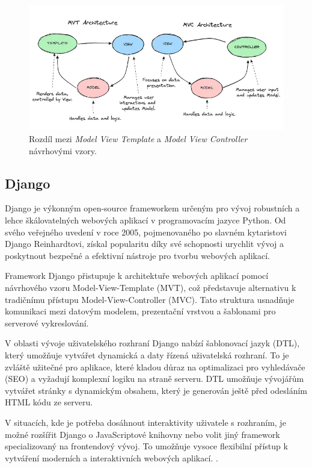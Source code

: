 \begin{figure}[H]
    \centering
    \includegraphics[width=1.0\textwidth]{figures/mvc_mvt_difference}
    \caption{Rozdíl mezi \textit{Model View Template} a \textit{Model View Controller} návrhovými vzory. \cite{mvc_mvt_difference_img}}
    \label{fig:mvc_mvt_difference}
\end{figure}

\subsection{Django}
\label{subsec:dev-framework-django}

Django je výkonným open-source frameworkem určeným pro vývoj robustních a lehce škálovatelných webových aplikací v programovacím jazyce Python. Od svého veřejného uvedení v roce 2005, pojmenovaného po slavném kytaristovi Django Reinhardtovi, získal popularitu díky své schopnosti urychlit vývoj a poskytnout bezpečné a efektivní nástroje pro tvorbu webových aplikací.

Framework Django přistupuje k architektuře webových aplikací pomocí návrhového vzoru Model-View-Template (MVT), což představuje alternativu k tradičnímu přístupu Model-View-Controller (MVC). Tato struktura usnadňuje komunikaci mezi datovým modelem, prezentační vrstvou a šablonami pro serverové vykreslování.

V oblasti vývoje uživatelského rozhraní Django nabízí šablonovací jazyk (DTL), který umožňuje vytvářet dynamická a daty řízená uživatelská rozhraní. To je zvláště užitečné pro aplikace, které kladou důraz na optimalizaci pro vyhledávače (SEO) a vyžadují komplexní logiku na straně serveru. DTL umožňuje vývojářům vytvářet stránky s dynamickým obsahem, který je generován ještě před odesláním HTML kódu ze serveru.

V situacích, kde je potřeba dosáhnout interaktivity uživatele s rozhraním, je možné rozšířit Django o JavaScriptové knihovny nebo volit jiný framework specializovaný na frontendový vývoj. To umožňuje vysoce flexibilní přístup k vytváření moderních a interaktivních webových aplikací. \cite{about_django}.

